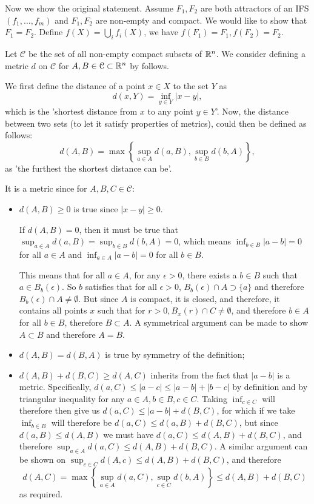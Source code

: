 Now we show the original statement. Assume \(F_1, F_2\) are both attractors of an IFS \((f_1, \ldots, f_m)\) and \(F_1, F_2\) are non-empty and compact. We would like to show that \(F_1 = F_2\). Define \(f(X) = \bigcup_i f_i(X)\), we have \(f(F_1) = F_1, f(F_2) = F_2\).

Let \(\mathcal{C}\) be the set of all non-empty compact subsets of \(\mathbb{R}^n\). We consider defining a metric \(d\) on \(\mathcal{C}\) for \(A, B \in \mathcal{C} \subset \mathbb{R}^n\) by follows.

We first define the distance of a point \(x \in X\) to the set \(Y\) as
\[
d(x, Y) = \inf_{y \in Y} |x - y|,
\]
which is the 'shortest distance from \(x\) to any point \(y \in Y\)'. Now, the distance between two sets (to let it satisfy properties of metrics), could then be defined as follows:
\[
d(A, B) = \max\left\{\sup_{a \in A} d(a, B), \sup_{b \in B} d(b, A) \right\},
\]
as 'the furthest the shortest distance can be'.

It is a metric since for \(A, B, C \in \mathcal{C}\):
\begin{itemize}
    \item \(d(A, B) \geq 0\) is true since \(|x - y| \geq 0\).
    
    If \(d(A, B) = 0\), then it must be true that \(\sup_{a \in A} d(a, B) = \sup_{b \in B} d(b, A) = 0\), which means \(\inf_{b \in B} |a - b| = 0\) for all \(a \in A\) and \(\inf_{a \in A} |a - b| = 0\) for all \(b \in B\).

    This means that for all \(a \in A\), for any \(\epsilon > 0\), there exists a \(b \in B\) such that \(a \in B_b(\epsilon)\). So \(b\) satisfies that for all \(\epsilon > 0\), \(B_b(\epsilon) \cap A \supset \{a\}\) and therefore \(B_b(\epsilon) \cap A \neq \emptyset\). But since \(A\) is compact, it is closed, and therefore, it contains all points \(x\) such that for \(r > 0, B_x(r) \cap C \neq \emptyset\), and therefore \(b \in A\) for all \(b \in B\), therefore \(B \subset A\). A symmetrical argument can be made to show \(A \subset B\) and therefore \(A = B\).
    
    \item \(d(A, B) = d(B, A)\) is true by symmetry of the definition;
    \item \(d(A, B) + d(B, C) \geq d(A, C)\) inherits from the fact that \(|a - b|\) is a metric. Specifically, \(d(a, C) \leq |a - c| \leq |a - b| + |b - c|\) by definition and by triangular inequality for any \(a \in A, b \in B, c \in C\). Taking \(\inf_{c \in C}\) will therefore then give us \(d(a, C) \leq |a - b| + d(B, C)\), for which if we take \(\inf_{b \in B}\) will therefore be \(d(a, C) \leq d(a, B) + d(B, C)\), but since \(d(a, B) \leq d(A, B)\) we must have \(d(a, C) \leq d(A, B) + d(B, C)\), and therefore \(\sup_{a \in A} d(a, C) \leq d(A, B) + d(B, C)\). A similar argument can be shown on \(\sup_{c \in C} d(A, c) \leq d(A, B) + d(B, C)\), and therefore
    \[d(A, C) = \max\left\{\sup_{a \in A} d(a, C), \sup_{c \in C} d(b, A) \right\}  \leq d(A, B) + d(B, C)\]
    as required.
\end{itemize}

